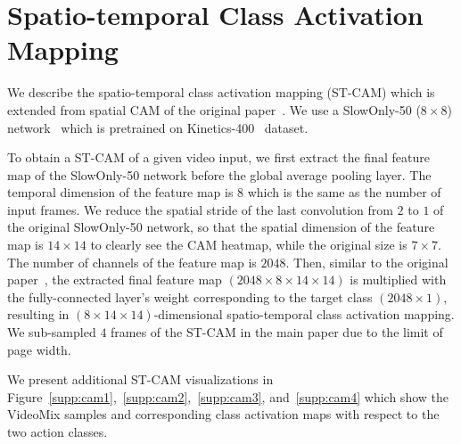 \section{Spatio-temporal Class Activation Mapping}
\label{appendix:st-cam}

We describe the spatio-temporal class activation mapping (ST-CAM) which is extended from spatial CAM of the original paper~\cite{zhou2016CAM}.
We use a SlowOnly-50 ($8\times8$) network~\cite{feichtenhofer2019slowfast} which is pretrained on Kinetics-400~\cite{kinetics} dataset. 

To obtain a ST-CAM of a given video input, we first extract the final feature map of the SlowOnly-50 network before the global average pooling layer. 
The temporal dimension of the feature map is $8$ which is the same as the number of input frames.
We reduce the spatial stride of the last convolution from $2$ to $1$ of the original SlowOnly-50 network, so that the spatial dimension of the feature map is $14 \times 14$ to clearly see the CAM heatmap, while the original size is $7 \times 7$.
The number of channels of the feature map is $2048$.
Then, similar to the original paper~\cite{zhou2016CAM}, the extracted final feature map $(2048\times8\times14\times14)$ is multiplied with the fully-connected layer's weight corresponding to the target class $(2048\times1)$, resulting in $(8\times14\times14)$-dimensional spatio-temporal class activation mapping.
We sub-sampled $4$ frames of the ST-CAM in the main paper due to the limit of page width. 

We present additional ST-CAM visualizations in Figure~\ref{supp:cam1},~\ref{supp:cam2},~\ref{supp:cam3}, and~\ref{supp:cam4} which show the VideoMix samples and corresponding class activation maps with respect to the two action classes. 


